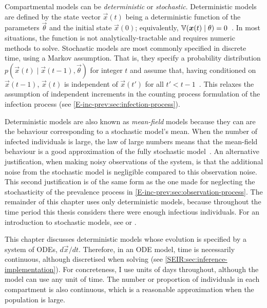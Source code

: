 \documentclass[thesis.tex]{subfiles}
\begin{document}
Compartmental models can be \emph{deterministic} or \emph{stochastic}.
Deterministic models are defined by the state vector $\vec{x}(t)$ being a deterministic function of the parameters $\vec{\theta}$ and the initial state $\vec{x}(0)$; equivalently, $\operatorname{\mathbb{V}}(\bm{x}(t) \mid \theta) = 0$~\autocite{birrellEvidence}.
In most situations, the function is not analytically-tractable and requires numeric methods to solve.
Stochastic models are most commonly specified in discrete time, using a Markov assumption.
That is, they specify a probability distribution $p(\vec{x}(t) \mid \vec{x}(t-1), \vec{\theta})$ for integer $t$ and assume that, having conditioned on $\vec{x}(t-1)$, $\vec{x}(t)$ is independent of $\vec{x}(t')$ for all $t' < t - 1$~\autocite{birrellEvidence}.
This relaxes the assumption of independent increments in the counting process formulation of the infection process (see \cref{E-inc-prev:sec:infection-process}).

Deterministic models are also known as \emph{mean-field} models because they can are the behaviour corresponding to a stochastic model's mean.
When the number of infected individuals is large, the law of large numbers means that the mean-field behaviour is a good approximation of the fully stochastic model~\autocite[20]{diekmannMathematical}.
An alternative justification, when making noisy observations of the system, is that the additional noise from the stochastic model is negligible compared to this observation noise.
This second justification is of the same form as the one made for neglecting the stochasticity of the prevalence process in \cref{E-inc-prev:sec:observation-process}.
The remainder of this chapter uses only deterministic models, because throughout the time period this thesis considers there were enough infectious individuals.
For an introduction to stochastic models, see \textcite[chapter 6]{keelingModeling} or \textcite{birrellEvidence}.

This chapter discusses deterministic models whose evolution is specified by a system of ODEs, $d\vec{x}/dt$.
Therefore, in an ODE model, time is necessarily continuous, although discretised when solving (see \cref{SEIR:sec:inference-implementation}).
For concreteness, I use units of days throughout, although the model can use any unit of time.
The number or proportion of individuals in each compartment is also continuous, which is a reasonable approximation when the population is large.
\end{document}
